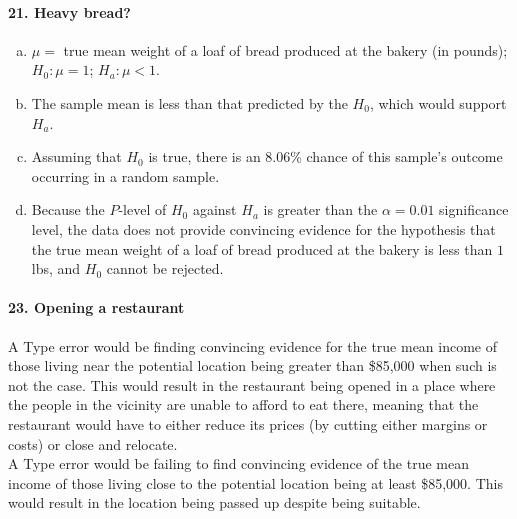 \documentclass[12pt, A4]{article}
\renewcommand{\Roman}[1]{\MakeUppercase{\romannumeral #1}}
\begin{document}
		\paragraph{21. Heavy bread?}
			\begin{enumerate}[a.]
				\item 
					$\mu = $ true mean weight of a loaf of bread produced at the bakery (in pounds); $H_0:\mu = 1$; $H_a:\mu < 1$.
				\item
					The sample mean is less than that predicted by the $H_0$, which would support $H_a$.
				\item
					Assuming that $H_0$ is true, there is an 8.06\% chance of this sample's outcome occurring in a random sample.
				\item
					Because the $P$-level of $H_0$ against $H_a$ is greater than the $\alpha = 0.01$ significance level, the data does not provide convincing evidence for the hypothesis that the true mean weight of a loaf of bread produced at the bakery is less than $1\,$lbs, and $H_0$ cannot be rejected.
			\end{enumerate}
		\paragraph{23. Opening a restaurant}
			A Type \Roman{1} error would be finding convincing evidence for the true mean income of those living near the potential location being greater than \$85,000 when such is not the case. This would result in the restaurant being opened in a place where the people in the vicinity are unable to afford to eat there, meaning that the restaurant would have to either reduce its prices (by cutting either margins or costs) or close and relocate. \\
			A Type \Roman{2} error would be failing to find convincing evidence of the true mean income of those living close to the potential location being at least \$85,000. This would result in the location being passed up despite being suitable.
\end{document}
